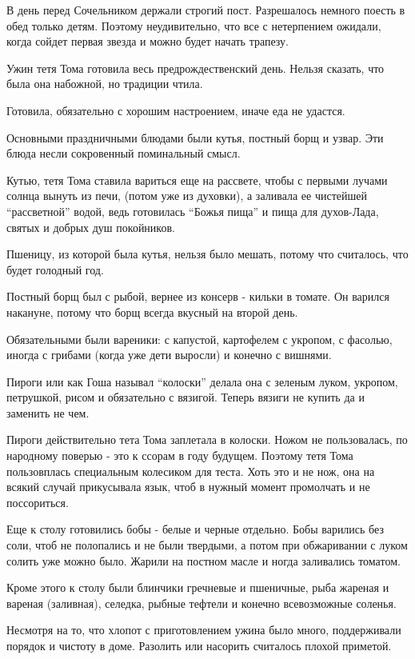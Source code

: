 В день перед Сочельником держали строгий пост. Разрешалось немного поесть в
обед только детям. Поэтому неудивительно, что все с нетерпением ожидали, когда
сойдет первая звезда и можно будет начать трапезу.

Ужин тетя Тома готовила весь предрождественский день. Нельзя сказать, что была
она набожной, но традиции чтила.

Готовила, обязательно с хорошим настроением, иначе еда не удастся.

Основными праздничными блюдами были кутья, постный борщ и узвар. Эти блюда
несли сокровенный поминальный смысл. 

Кутью, тетя Тома ставила вариться еще на рассвете, чтобы с первыми лучами
солнца вынуть из печи, (потом уже из духовки), а заливала ее чистейшей
\enquote{рассветной} водой, ведь готовилась \enquote{Божья пища} и пища для
духов-Лада, святых и добрых душ покойников.

Пшеницу, из которой была кутья, нельзя было мешать, потому что считалось, что
будет голодный год. 

Постный борщ был с рыбой, вернее из консерв - кильки в томате. Он варился
накануне, потому что борщ всегда вкусный на второй день.

Обязательными были вареники: с капустой, картофелем с укропом, с фасолью,
иногда с грибами (когда уже дети выросли) и конечно с вишнями. 

Пироги или как Гоша называл \enquote{колоски} делала она с зеленым луком,  укропом,
петрушкой, рисом и обязательно с вязигой. Теперь вязиги не купить да и заменить
не чем.

Пироги действительно тета Тома заплетала в колоски. Ножом не пользовалась, по
народному поверью - это к ссорам в году будущем. Поэтому тетя Тома пользовплась
специальным колесиком для теста. Хоть это и не нож, она на всякий случай
прикусывала язык, чтоб в нужный момент промолчать и не поссориться.

Еще к столу готовились бобы - белые и черные отдельно. Бобы варились без соли,
чтоб не полопались и не были твердыми, а потом при обжаривании с луком солить
уже можно было. Жарили на постном масле и ногда заливались томатом.

Кроме этого к столу были блинчики гречневые и пшеничные, рыба жареная и вареная
(заливная), селедка, рыбные тефтели и конечно всевозможные соленья.

Несмотря на то, что хлопот с приготовлением ужина было много, поддерживали
порядок и чистоту в доме.  Разолить или насорить считалось плохой приметой.

